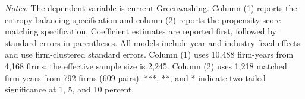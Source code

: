 \begin{table}[H]
    \centering
    \caption{Binary Complements to GPS--IPW}
    \label{tab:gps-binary-matching}
    \par\smallskip
    \begin{minipage}{0.95\textwidth}
        \footnotesize
        \textit{Notes:} The dependent variable is current Greenwashing. Column (1) reports the entropy-balancing specification and column (2) reports the propensity-score matching specification. Coefficient estimates are reported first, followed by standard errors in parentheses. All models include year and industry fixed effects and use firm-clustered standard errors. Column (1) uses 10,488 firm-years from 4,168 firms; the effective sample size is 2,245. Column (2) uses 1,218 matched firm-years from 792 firms (609 pairs). ***, **, and * indicate two-tailed significance at 1, 5, and 10 percent.
    \end{minipage}
\end{table}
